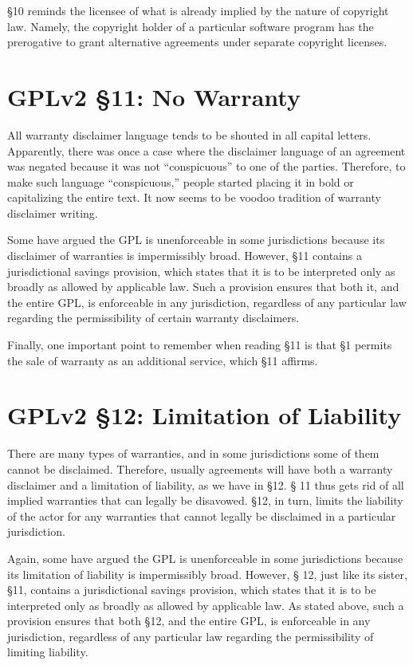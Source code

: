 \S 10 reminds the licensee of what is already implied by the nature of
copyright law. Namely, the copyright holder of a particular software
program has the prerogative to grant alternative agreements under separate
copyright licenses.

\section{GPLv2 \S 11: No Warranty}
\label{GPLs11}

All warranty disclaimer language tends to be shouted in all capital
letters. Apparently, there was once a case where the disclaimer language
of an agreement was negated because it was not ``conspicuous'' to one of
the parties. Therefore, to make such language ``conspicuous,'' people
started placing it in bold or capitalizing the entire text. It now seems
to be voodoo tradition of warranty disclaimer writing.

Some have argued the GPL is unenforceable in some jurisdictions because
its disclaimer of warranties is impermissibly broad. However, \S 11
contains a jurisdictional savings provision, which states that it is to be
interpreted only as broadly as allowed by applicable law. Such a
provision ensures that both it, and the entire GPL, is enforceable in any
jurisdiction, regardless of any particular law regarding the
permissibility of certain warranty disclaimers.

Finally, one important point to remember when reading \S 11 is that \S 1
permits the sale of warranty as an additional service, which \S 11 affirms.

\section{GPLv2 \S 12: Limitation of Liability}
\label{GPLs12}

There are many types of warranties, and in some jurisdictions some of them
cannot be disclaimed. Therefore, usually agreements will have both a
warranty disclaimer and a limitation of liability, as we have in \S 12. \S
11 thus gets rid of all implied warranties that can legally be
disavowed. \S 12, in turn, limits the liability of the actor for any
warranties that cannot legally be disclaimed in a particular jurisdiction.

Again, some have argued the GPL is unenforceable in some jurisdictions
because its limitation of liability is impermissibly broad. However, \S
12, just like its sister, \S 11, contains a jurisdictional savings
provision, which states that it is to be interpreted only as broadly as
allowed by applicable law. As stated above, such a provision ensures that
both \S 12, and the entire GPL, is enforceable in any jurisdiction,
regardless of any particular law regarding the permissibility of limiting
liability.

